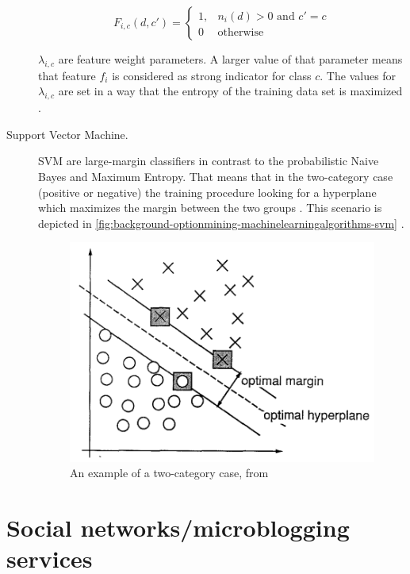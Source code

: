 \begin{description}
  \begin{equation}
  F_{i,c}(d,c') = 
    \begin{cases}
      1, & n_i(d) > 0 \text{ and } c' = c \\
      0  & \text{otherwise}
    \end{cases}
	\label{eq:background-optionmining-machinelearningalgorithms-maximumentropy_fic}
  \end{equation}

  $\lambda_{i,c}$ are feature weight parameters. A larger value of that parameter means that feature $f_i$ is considered as strong indicator for class $c$.
  The values for $\lambda_{i,c}$ are set in a way that the entropy of the training data set is maximized \cite{Pang2002}.
  	
	\item[Support Vector Machine.]
   \ac{SVM} are large-margin classifiers in contrast to the probabilistic Naive Bayes and Maximum Entropy.
   That means that in the two-category case (positive or negative) the training procedure looking for a hyperplane which maximizes the margin between the two groups \cite{Pang2002}.
   This scenario is depicted in \autoref{fig:background-optionmining-machinelearningalgorithms-svm} \cite[p. 275]{Cortes1995}.
      
   \begin{figure}[ht]
    \centering
    \includegraphics[width=.7\textwidth]{images/svm.png}
    \caption{An example of a two-category case, from \cite[p. 275]{Cortes1995}}
    \label{fig:background-optionmining-machinelearningalgorithms-svm}
  \end{figure}
	
\end{description}

\section{Social networks/microblogging services}
\label{s:background-socialnetworks}

